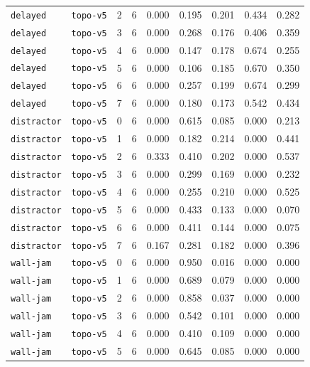 \documentclass{article}
\begin{document}
\begin{center}
\begin{tabular}{lllcccccc}
\texttt{delayed} & \texttt{topo-v5} & 2 & 6 & 0.000 & 0.195 & 0.201 & 0.434 & 0.282 \\
\texttt{delayed} & \texttt{topo-v5} & 3 & 6 & 0.000 & 0.268 & 0.176 & 0.406 & 0.359 \\
\texttt{delayed} & \texttt{topo-v5} & 4 & 6 & 0.000 & 0.147 & 0.178 & 0.674 & 0.255 \\
\texttt{delayed} & \texttt{topo-v5} & 5 & 6 & 0.000 & 0.106 & 0.185 & 0.670 & 0.350 \\
\texttt{delayed} & \texttt{topo-v5} & 6 & 6 & 0.000 & 0.257 & 0.199 & 0.674 & 0.299 \\
\texttt{delayed} & \texttt{topo-v5} & 7 & 6 & 0.000 & 0.180 & 0.173 & 0.542 & 0.434 \\
\texttt{distractor} & \texttt{topo-v5} & 0 & 6 & 0.000 & 0.615 & 0.085 & 0.000 & 0.213 \\
\texttt{distractor} & \texttt{topo-v5} & 1 & 6 & 0.000 & 0.182 & 0.214 & 0.000 & 0.441 \\
\texttt{distractor} & \texttt{topo-v5} & 2 & 6 & 0.333 & 0.410 & 0.202 & 0.000 & 0.537 \\
\texttt{distractor} & \texttt{topo-v5} & 3 & 6 & 0.000 & 0.299 & 0.169 & 0.000 & 0.232 \\
\texttt{distractor} & \texttt{topo-v5} & 4 & 6 & 0.000 & 0.255 & 0.210 & 0.000 & 0.525 \\
\texttt{distractor} & \texttt{topo-v5} & 5 & 6 & 0.000 & 0.433 & 0.133 & 0.000 & 0.070 \\
\texttt{distractor} & \texttt{topo-v5} & 6 & 6 & 0.000 & 0.411 & 0.144 & 0.000 & 0.075 \\
\texttt{distractor} & \texttt{topo-v5} & 7 & 6 & 0.167 & 0.281 & 0.182 & 0.000 & 0.396 \\
\texttt{wall-jam} & \texttt{topo-v5} & 0 & 6 & 0.000 & 0.950 & 0.016 & 0.000 & 0.000 \\
\texttt{wall-jam} & \texttt{topo-v5} & 1 & 6 & 0.000 & 0.689 & 0.079 & 0.000 & 0.000 \\
\texttt{wall-jam} & \texttt{topo-v5} & 2 & 6 & 0.000 & 0.858 & 0.037 & 0.000 & 0.000 \\
\texttt{wall-jam} & \texttt{topo-v5} & 3 & 6 & 0.000 & 0.542 & 0.101 & 0.000 & 0.000 \\
\texttt{wall-jam} & \texttt{topo-v5} & 4 & 6 & 0.000 & 0.410 & 0.109 & 0.000 & 0.000 \\
\texttt{wall-jam} & \texttt{topo-v5} & 5 & 6 & 0.000 & 0.645 & 0.085 & 0.000 & 0.000 \\
\bottomrule
\end{tabular}
\end{center}
\end{document}
